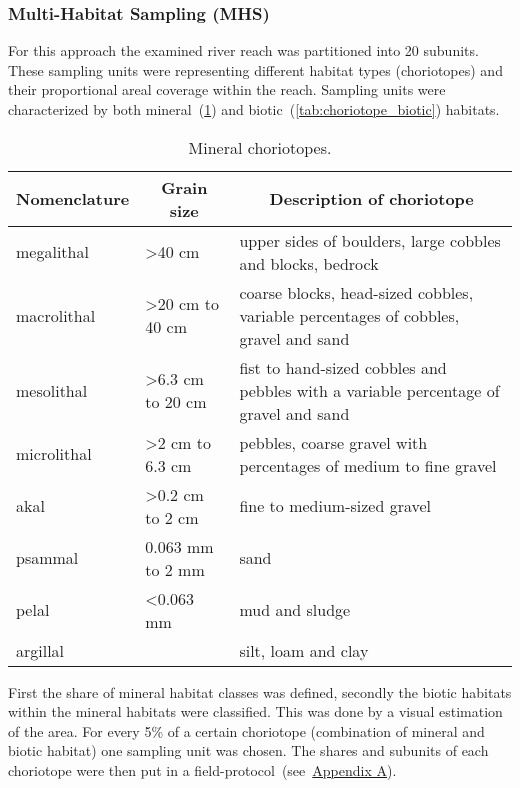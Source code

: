 \subsubsection{Multi-Habitat Sampling (MHS)}\label{sec:mhs}         %


For this approach the examined river reach was partitioned into 20 subunits. These sampling units were representing different habitat types (choriotopes) and their proportional areal coverage within the reach. Sampling units were characterized by both mineral~(\cref{tab:choriotope_mineral}) and biotic~(\cref{tab:choriotope_biotic}) habitats.


\begin{table}[!htb]                                 %
  \small                                                       %
  \centering
  \caption{Mineral choriotopes.}
    \begin{tabular}{ l l p{7cm} }
  \toprule
    Nomenclature  &
    \multicolumn{1}{c}{Grain size}  &
    \multicolumn{1}{c}{Description of choriotope} \\
  \hline
  \hline
    megalithal      & \textgreater 40 cm               & upper sides of boulders, large cobbles and blocks, bedrock\\
    macrolithal     & \textgreater 20 cm to 40 cm      & coarse blocks, head-sized cobbles, variable percentages of cobbles, gravel and sand\\
    mesolithal      & \textgreater 6.3 cm to 20 cm     & fist to hand-sized cobbles and pebbles with a variable percentage of gravel and sand\\
    microlithal     & \textgreater 2 cm to 6.3 cm      & pebbles, coarse gravel with percentages of medium to fine gravel\\
    akal            & \textgreater 0.2 cm to 2 cm      & fine to medium-sized gravel\\
    psammal         & 0.063 mm to 2 mm      & sand\\
    pelal           & \textless 0.063 mm            & mud and sludge\\
    argillal        &                       & silt, loam and clay\\
  \bottomrule
    \end{tabular}
  \label{tab:choriotope_mineral}%
\end{table}%


First the share of mineral habitat classes was defined, secondly the biotic habitats within the mineral habitats were classified. This was done by a visual estimation of the area. For every 5\% of a certain choriotope (combination of mineral and biotic habitat) one sampling unit was chosen. The shares and subunits of each choriotope were then put in a field-protocol~(see~\hyperref[appendixA]{Appendix A}).

